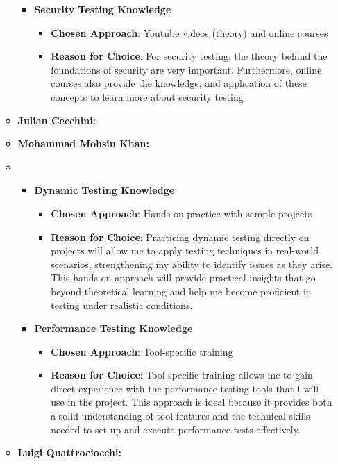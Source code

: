 \documentclass[12pt, titlepage]{article}
\begin{document}
\begin{enumerate}
\begin{itemize}
\begin{itemize}
      \item \textbf{Security Testing Knowledge}  
        \begin{itemize}
            \item \textbf{Chosen Approach}: Youtube videos (theory) and online
            courses
            \item \textbf{Reason for Choice}: For security testing, the theory
            behind the foundations of security are very important. Furthermore,
            online courses also provide the knowledge, and application of these
            concepts to learn more about security testing
        \end{itemize}
    \end{itemize}
    \item \textbf{Julian Cecchini:} 
    \item \textbf{Mohammad Mohsin Khan:}
    \item \begin{itemize}
      \item \textbf{Dynamic Testing Knowledge}  
      \begin{itemize}
          \item \textbf{Chosen Approach}: Hands-on practice with sample projects
          \item \textbf{Reason for Choice}: Practicing dynamic testing directly on projects will allow me to apply testing techniques in real-world scenarios, strengthening my ability to identify issues as they arise. This hands-on approach will provide practical insights that go beyond theoretical learning and help me become proficient in testing under realistic conditions.
      \end{itemize}
  
      \item \textbf{Performance Testing Knowledge}  
      \begin{itemize}
          \item \textbf{Chosen Approach}: Tool-specific training
          \item \textbf{Reason for Choice}: Tool-specific training allows me to gain direct experience with the performance testing tools that I will use in the project. This approach is ideal because it provides both a solid understanding of tool features and the technical skills needed to set up and execute performance tests effectively.
      \end{itemize}
  
  \end{itemize}
    \item \textbf{Luigi Quattrociocchi:}
\end{itemize}
\end{enumerate}
\end{document}
